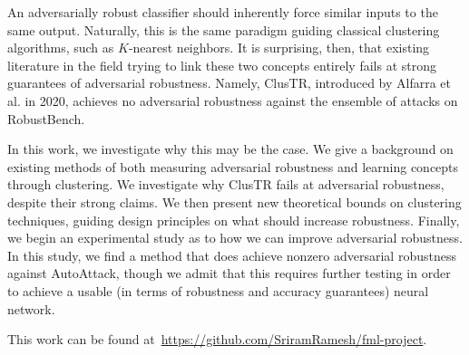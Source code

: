 An adversarially robust classifier should inherently force similar inputs to the same output. Naturally, this is the same paradigm guiding classical clustering algorithms, such as $K$-nearest neighbors. It is surprising, then, that existing literature in the field trying to link these two concepts entirely fails at strong guarantees of adversarial robustness. Namely, ClusTR, introduced by Alfarra et al. in 2020, achieves no adversarial robustness against the ensemble of attacks on RobustBench.

In this work, we investigate why this may be the case. We give a background on existing methods of both measuring adversarial robustness and learning concepts through clustering. We investigate why ClusTR fails at adversarial robustness, despite their strong claims. We then present new theoretical bounds on clustering techniques, guiding design principles on what should increase robustness. Finally, we begin an experimental study as to how we can improve adversarial robustness. In this study, we find a method that does achieve nonzero adversarial robustness against AutoAttack, though we admit that this requires further testing in order to achieve a usable (in terms of robustness and accuracy guarantees) neural network. 

This work can be found at~\url{https://github.com/SriramRamesh/fml-project}.